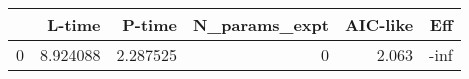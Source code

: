 \begin{tabular}{lrrrrr}
\toprule
{} &    L-time &    P-time &  N\_params\_expt &  AIC-like &  Eff \\
\midrule
0 &  8.924088 &  2.287525 &              0 &     2.063 & -inf \\
\bottomrule
\end{tabular}

